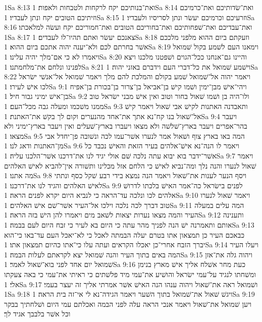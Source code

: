 1Sa 8:13  ואת־בנותיכם יקח לרקחות ולטבחות ולאפות׃
1Sa 8:14  ואת־שׂדותיכם ואת־כרמיכם וזיתיכם הטובים יקח ונתן לעבדיו׃
1Sa 8:15  וזרעיכם וכרמיכם יעשׂר ונתן לסריסיו ולעבדיו׃
1Sa 8:16  ואת־עבדיכם ואת־שׁפחותיכם ואת־בחוריכם הטובים ואת־חמוריכם יקח ועשׂה למלאכתו׃
1Sa 8:17  צאנכם יעשׂר ואתם תהיו־לו לעבדים׃
1Sa 8:18  וזעקתם ביום ההוא מלפני מלככם אשׁר בחרתם לכם ולא־יענה יהוה אתכם ביום ההוא׃
1Sa 8:19  וימאנו העם לשׁמע בקול שׁמואל ויאמרו לא כי אם־מלך יהיה עלינו׃
1Sa 8:20  והיינו גם־אנחנו ככל־הגוים ושׁפטנו מלכנו ויצא לפנינו ונלחם את־מלחמתנו׃
1Sa 8:21  וישׁמע שׁמואל את כל־דברי העם וידברם באזני יהוה׃
1Sa 8:22  ויאמר יהוה אל־שׁמואל שׁמע בקולם והמלכת להם מלך ויאמר שׁמואל אל־אנשׁי ישׂראל לכו אישׁ לעירו׃
1Sa 9:1  ויהי־אישׁ מבן־ימין ושׁמו קישׁ בן־אביאל בן־צרור בן־בכורת בן־אפיח בן־אישׁ ימיני גבור חיל׃
1Sa 9:2  ולו־היה בן ושׁמו שׁאול בחור וטוב ואין אישׁ מבני ישׂראל טוב ממנו משׁכמו ומעלה גבה מכל־העם׃
1Sa 9:3  ותאבדנה האתנות לקישׁ אבי שׁאול ויאמר קישׁ אל־שׁאול בנו קח־נא אתך את־אחד מהנערים וקום לך בקשׁ את־האתנת׃
1Sa 9:4  ויעבר בהר־אפרים ויעבר בארץ־שׁלשׁה ולא מצאו ויעברו בארץ־שׁעלים ואין ויעבר בארץ־ימיני ולא מצאו׃
1Sa 9:5  המה באו בארץ צוף ושׁאול אמר לנערו אשׁר־עמו לכה ונשׁובה פן־יחדל אבי מן־האתנות ודאג לנו׃
1Sa 9:6  ויאמר לו הנה־נא אישׁ־אלהים בעיר הזאת והאישׁ נכבד כל אשׁר־ידבר בוא יבוא עתה נלכה שׁם אולי יגיד לנו את־דרכנו אשׁר־הלכנו עליה׃
1Sa 9:7  ויאמר שׁאול לנערו והנה נלך ומה־נביא לאישׁ כי הלחם אזל מכלינו ותשׁורה אין־להביא לאישׁ האלהים מה אתנו׃
1Sa 9:8  ויסף הנער לענות את־שׁאול ויאמר הנה נמצא בידי רבע שׁקל כסף ונתתי לאישׁ האלהים והגיד לנו את־דרכנו׃
1Sa 9:9  לפנים בישׂראל כה־אמר האישׁ בלכתו לדרושׁ אלהים לכו ונלכה עד־הראה כי לנביא היום יקרא לפנים הראה׃
1Sa 9:10  ויאמר שׁאול לנערו טוב דברך לכה נלכה וילכו אל־העיר אשׁר־שׁם אישׁ האלהים׃
1Sa 9:11  המה עלים במעלה העיר והמה מצאו נערות יצאות לשׁאב מים ויאמרו להן הישׁ בזה הראה׃
1Sa 9:12  ותענינה אותם ותאמרנה ישׁ הנה לפניך מהר עתה כי היום בא לעיר כי זבח היום לעם בבמה׃
1Sa 9:13  כבאכם העיר כן תמצאון אתו בטרם יעלה הבמתה לאכל כי לא־יאכל העם עד־באו כי־הוא יברך הזבח אחרי־כן יאכלו הקראים ועתה עלו כי־אתו כהיום תמצאון אתו׃
1Sa 9:14  ויעלו העיר המה באים בתוך העיר והנה שׁמואל יצא לקראתם לעלות הבמה׃
1Sa 9:15  ויהוה גלה את־אזן שׁמואל יום אחד לפני בוא־שׁאול לאמר׃
1Sa 9:16  כעת מחר אשׁלח אליך אישׁ מארץ בנימן ומשׁחתו לנגיד על־עמי ישׂראל והושׁיע את־עמי מיד פלשׁתים כי ראיתי את־עמי כי באה צעקתו אלי׃
1Sa 9:17  ושׁמואל ראה את־שׁאול ויהוה ענהו הנה האישׁ אשׁר אמרתי אליך זה יעצר בעמי׃
1Sa 9:18  ויגשׁ שׁאול את־שׁמואל בתוך השׁער ויאמר הגידה־נא לי אי־זה בית הראה׃
1Sa 9:19  ויען שׁמואל את־שׁאול ויאמר אנכי הראה עלה לפני הבמה ואכלתם עמי היום ושׁלחתיך בבקר וכל אשׁר בלבבך אגיד לך׃
